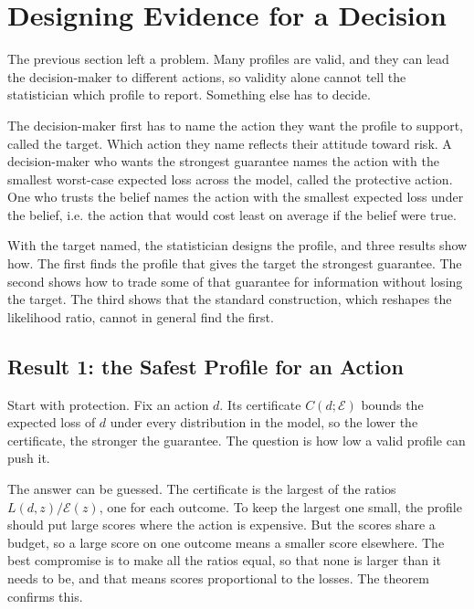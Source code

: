 \section{Designing Evidence for a Decision}\label{sec:choosing}

The previous section left a problem. Many profiles are valid, and they
can lead the decision-maker to different actions, so validity alone cannot
tell the statistician which profile to report. Something else has to decide.

The decision-maker first has to name the action they want the profile to
support, called the target. Which action they name reflects their attitude
toward risk. A decision-maker who wants the
strongest guarantee names the action with the smallest worst-case expected
loss across the model, called the protective action. One who trusts the
belief names the action with the smallest expected loss under the belief,
i.e. the action that would cost least on average if the belief were true.

With the target named, the statistician designs the profile, and three
results show how. The first finds the profile that gives the target the
strongest guarantee. The second shows how to trade some of that guarantee for
information without losing the target. The third shows that the standard
construction, which reshapes the likelihood ratio, cannot in general find the
first.

\subsection{Result 1: the Safest Profile for an Action}\label{sec:result1}

Start with protection. Fix an action $d$. Its certificate $C(d;\mathcal E)$
bounds the expected loss of $d$ under every distribution in the model, so the
lower the certificate, the stronger the guarantee. The question is how low a
valid profile can push it.

The answer can be guessed. The certificate is the largest of the ratios
$L(d,z)/\mathcal E(z)$, one for each outcome. To keep the largest one small,
the profile should put large scores where the action is expensive. But the
scores share a budget, so a large score on one outcome means a smaller score
elsewhere. The best compromise is to make all the ratios equal, so that none
is larger than it needs to be, and that means scores proportional to the
losses. The theorem confirms this.

